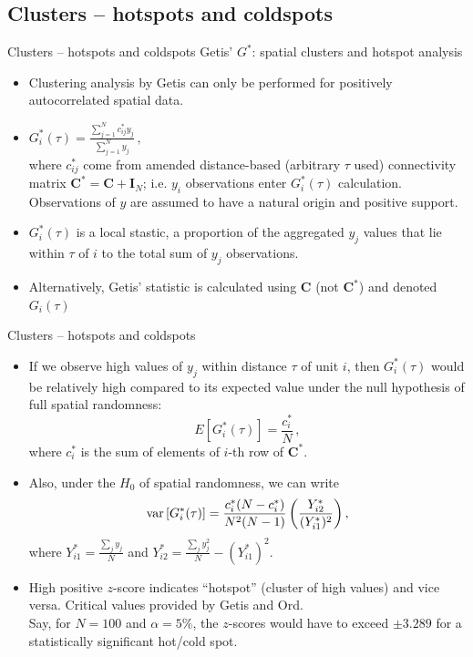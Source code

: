 \documentclass{beamer}
\begin{document}
\subsection{Clusters -- hotspots and coldspots}
\begin{frame}{Clusters -- hotspots and coldspots}
Getis' $G^{\ast}$: spatial clusters and hotspot analysis\\
\smallskip
\begin{itemize}
    \item Clustering analysis by Getis can only be performed for positively autocorrelated spatial data.
    \smallskip
    \item $G_i^{\ast}(\tau) = \frac{\sum_{j=1}^N c_{ij}^{\ast} y_j}{\sum_{j=1}^N y_j} \,,$\\
    \smallskip
    where $c_{ij}^{\ast}$ come from amended distance-based (arbitrary $\tau$ used) connectivity matrix $\bm{C}^{\ast} = \bm{C}+\bm{I}_N$; i.e. $y_i$ observations enter $G_i^{\ast}(\tau)$ calculation. Observations of $y$ are assumed to have a natural origin and positive support.
    \smallskip
    \item $G_i^{\ast}(\tau)$ is a local stastic, a proportion of the aggregated $y_j$ values that lie within $\tau$ of $i$ to the total sum of $y_j$ observations.
    \smallskip
    \item Alternatively, Getis' statistic is calculated using $\bm{C}$ (not $\bm{C}^{\ast}$) and denoted $G_i(\tau)$ 
\end{itemize}
\end{frame}
\begin{frame}{Clusters -- hotspots and coldspots}
\begin{itemize}
    \item If we observe high values of $y_j$ within distance $\tau$ of unit $i$, then $G_i^{\ast}(\tau)$ would be relatively high compared to its expected value under the null hypothesis of full spatial randomness: $$E \left[G_i^{\ast}(\tau) \right] = \frac{c_i^{\ast}}{N}\,,$$ where $c_i^{\ast}$ is the sum of elements of $i$-th row of $\bm{C}^{\ast}$.
    \medskip 
    \item Also, under the $H_0$ of spatial randomness, we can write
    $$
    \textnormal{var} \left[G_i^*(\tau) \right] = 
    \frac{c_i^*(N-c_i^*)}{N^2 (N-1)}
    \left( \frac{Y_{i2}^*}{(Y_{i1}^*)^2} \right) , 
    $$ 
    where $Y_{i1}^*=\tfrac{\sum_j y_j}{N}$ and $Y_{i2}^*=\tfrac{\sum_j y_j^2}{N}-(Y_{i1}^*)^2$.
    \medskip 
    \item High positive $z$-score indicates ``hotspot'' (cluster of high values) and vice versa. Critical values provided by Getis and Ord. \\Say, for $N = 100$ and $\alpha = 5\%$, the $z$-scores would have to exceed $\pm 3.289$ for a statistically significant hot/cold spot.
\end{itemize}
\end{frame}
\end{document}
